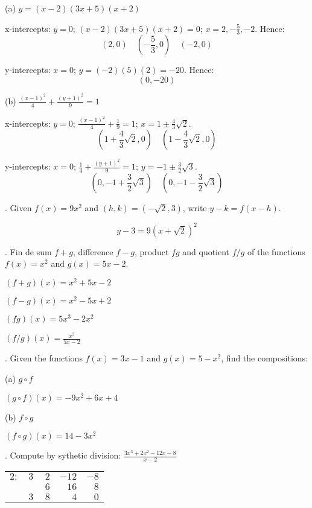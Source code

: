 \documentclass{article}
\begin{document}
\noindent (a) $\displaystyle y = (x-2)(3x+5)(x+2)$

\noindent x-intercepts: $y=0$; $(x-2)(3x+5)(x+2)=0$; 
$x = 2, -\frac 5 3, -2$. Hence:
$$
(2,0)\quad(-\frac 5 3,0)\quad(-2,0)
$$

\noindent y-intercepts: $x=0$; $y = (-2)(5)(2) = -20$. Hence:
$$
(0,-20)
$$

\noindent (b) $\displaystyle \frac {(x-1)^2}{4} + \frac {(y+1)^2}{9} = 1$

x-intercepts: $y=0$; $\displaystyle \frac {(x-1)^2}{4} + \frac 1 9 = 1$;
$x=1\pm \frac 4 3 \sqrt{2}$.
$$
(1 + \frac 4 3 \sqrt{2},0)\quad(1 - \frac 4 3 \sqrt{2},0)
$$

y-intercepts: $x=0$; $\frac 1 4 + \frac {(y+1)^2}{9} = 1$;
$y = -1 \pm \frac 3 2 \sqrt{3}$.
$$
(0,-1 + \frac 3 2 \sqrt{3})\quad(0,-1 - \frac 3 2 \sqrt{3})
$$

\medskip

. Given $\displaystyle f(x) = 9 x^2$ and 
$\displaystyle (h,k)=(-\sqrt{2},3)$, write $\displaystyle y-k=f(x-h)$.

$$
y - 3 = 9 (x + \sqrt{2})^2
$$

\medskip

. Fin de sum $f+g$, difference $f-g$, product $fg$ 
and quotient $f/g$ of the functions 
$\displaystyle f(x) = x^2$ and $\displaystyle g(x) = 5x-2$.

  $\displaystyle (f+g)(x) = x^2 + 5x - 2$

  $\displaystyle (f-g)(x) = x^2 - 5x + 2$

  $\displaystyle (fg)(x) = 5x^3 - 2x^2$

  $\displaystyle (f/g)(x) = \frac {x^2}{5x-2}$

\medskip

. Given the functions $\displaystyle f(x) = 3x-1$ and 
$\displaystyle g(x) = 5-x^2$, find the compositions:

\noindent (a) $\displaystyle g \circ f$

  $\displaystyle (g \circ f)(x) = -9x^2+6x+4$

\noindent (b) $\displaystyle f \circ g$

  $\displaystyle (f \circ g)(x) = 14 - 3x^2$

\medskip

. Compute by sythetic division: 
$\displaystyle \frac {3x^3+2x^2-12x-8} {x-2}$

\begin{center}
\begin{tabular}{rrrrr}
$2:$ & $3$ & $\ 2$ & $-12$ & $-8$\\
 & & $6$ & $16$ & $8$\\
\hline
 & $3$ & $8$ & $4$ & $0$
\end{tabular}
\end{center}
\end{document}
